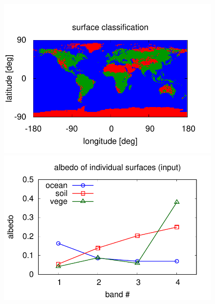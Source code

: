 \documentclass[iop,numberedappendix,apj,]{emulateapj}
\begin{document}
\begin{figure}[!bpth]
    \begin{minipage}{0.5\hsize}
    \begin{center}
\includegraphics[width=\hsize]{IGBP_simplemap.pdf}
    \end{center}
     \end{minipage}
  \begin{minipage}{0.5\hsize}
    \begin{center}
    \includegraphics[width=\hsize]{mockdata_quadrature_bandsp.pdf}
    \end{center}
\end{minipage}
  \begin{minipage}{0.5\hsize}
    \begin{center}

\end{center}
\end{minipage}
\end{figure}
\end{document}
